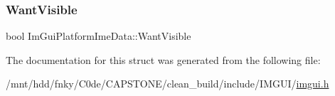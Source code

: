 \mbox{\label{structImGuiPlatformImeData_a92dc237c81108817980aa332bd967d48}} 
\subsubsection{\texorpdfstring{Want\+Visible}{WantVisible}}
{\footnotesize\ttfamily bool Im\+Gui\+Platform\+Ime\+Data\+::\+Want\+Visible}



The documentation for this struct was generated from the following file\+:\begin{DoxyCompactItemize}
\item 
/mnt/hdd/fnky/\+C0de/\+C\+A\+P\+S\+T\+O\+N\+E/clean\+\_\+build/include/\+I\+M\+G\+U\+I/\hyperlink{imgui_8h}{imgui.\+h}\end{DoxyCompactItemize}
